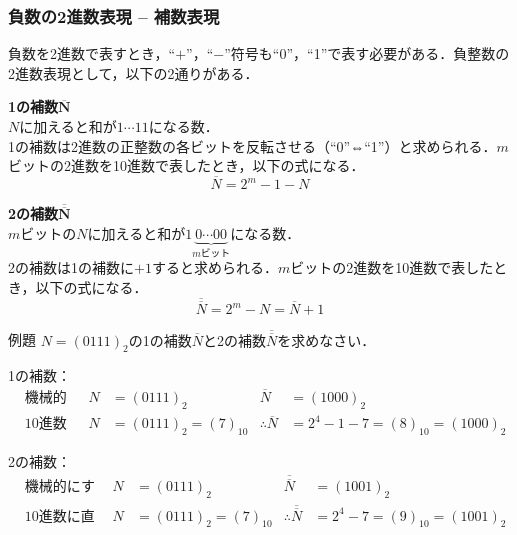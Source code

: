 \subsubsection{負数の2進数表現 -- 補数表現}\label{sec27-2-C-4}

負数を2進数で表すとき，“$+$”，“$-$”符号も“0”，“1”で表す必要がある．負整数の2進数表現として，以下の2通りがある．

\begin{enumerate}[label=\textbf{[\arabic*]}, labelsep=10pt, leftmargin=23pt]
	\item \textbf{1の補数$\bm{\overline{N}}$}\\
		$N$に加えると和が$1\cdots 11$になる数．\\
		1の補数は2進数の正整数の各ビットを反転させる（“0”⇔“1”）と求められる．$m$ビットの2進数を10進数で表したとき，以下の式になる．
		\begin{equation}
			\overline{N} = 2^m - 1 - N
		\end{equation}
	\item \textbf{2の補数$\bm{\overline{\overline{N}}}$}\\
		$m$ビットの$N$に加えると和が$1\underbrace{0\cdots 00}_{\text{$m$ビット}}$になる数．\\
		2の補数は1の補数に$+1$すると求められる．$m$ビットの2進数を10進数で表したとき，以下の式になる．
		\begin{equation}
			\overline{\overline{N}} = 2^m - N = \overline{N} + 1
		\end{equation}
\end{enumerate}

\begin{tip}{例題}
	\textsf{$N = (0111)_{2}$の1の補数$\overline{N}$と2の補数$\overline{\overline{N}}$を求めなさい．}

	\tcblower

	1の補数：
	\begin{align*}
		&\text{機械的にする場合} & N &= (0111)_{2} & \overline{N} &= (1000)_{2}\\
		&\text{10進数に直して考える場合} & N &= (0111)_{2} = (7)_{10} & \therefore \overline{N} &= 2^4 - 1 - 7 = (8)_{10} = (1000)_{2}
	\end{align*}

	2の補数：
	\begin{align*}
		&\text{機械的にする場合} & N &= (0111)_{2} & \overline{\overline{N}} &= (1001)_{2}\\
		&\text{10進数に直して考える場合} & N &= (0111)_{2} = (7)_{10} & \therefore \overline{\overline{N}} &= 2^4 - 7 = (9)_{10} = (1001)_{2}
	\end{align*}
\end{tip}

